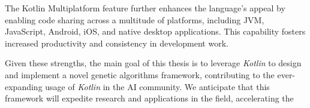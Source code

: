   The Kotlin Multiplatform feature further enhances the language's appeal by
  enabling code sharing across a multitude of platforms, including JVM,
  JavaScript, Android, iOS, and native desktop applications.
  This capability fosters increased productivity and consistency in
  development work.

  Given these strengths, the main goal of this thesis is to leverage
  \textit{Kotlin} to design and implement a novel genetic algorithms
  framework, contributing to the ever-expanding usage of \textit{Kotlin} in
  the AI community.
  We anticipate that this framework will expedite research and applications in
  the field, accelerating the